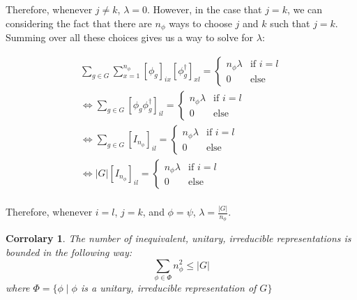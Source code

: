 \documentclass[10pt]{ucthesis}
\newtheorem{corrolary}[definition]{Corrolary}
\begin{document}
Therefore, whenever $j\neq k$, $\lambda = 0$. However, in the case that $j=k$, we can considering the fact that there are $n_\phi$ ways to choose $j$ and $k$ such that $j=k$. Summing over all these choices gives us a way to solve for $\lambda$:

$$\begin{aligned}
			\sum_{g\in G} \sum_{x=1}^{n_\phi}\left[\phi_g\right]_{ix}\left[\phi^\dag_g\right]_{xl} = \begin{cases}
																			n_\phi\lambda &\text{if } i = l\\
																			0 & \text{else}
																			\end{cases}\\
\Leftrightarrow
			\sum_{g\in G} \left[\phi_g\phi^\dag_g\right]_{il} = \begin{cases}
																			n_\phi\lambda &\text{if } i = l\\
																			0 & \text{else}
																			\end{cases}\\
\Leftrightarrow
			\sum_{g\in G} \left[I_{n_\phi}\right]_{il} = \begin{cases}
																			n_\phi\lambda &\text{if } i = l\\
																			0 & \text{else}
																			\end{cases}\\
\Leftrightarrow
			|G|\left[I_{n_\phi}\right]_{il} = \begin{cases}
																			n_\phi\lambda &\text{if } i = l\\
																			0 & \text{else}
																			\end{cases}\\
\end{aligned}$$ 

Therefore, whenever $i=l$, $j=k$, and $\phi=\psi$, $\lambda = \frac{|G|}{n_\phi}$. \qedsymbol \\



\begin{corrolary}
	The number of inequivalent, unitary, irreducible representations is bounded in the following way:
$$\sum_{\phi \in \Phi}n^2_\phi \leq |G|$$
where $\Phi = \{\phi \mid \phi$ is a unitary, irreducible representation of $G\}$
\end{corrolary}
\end{document}
